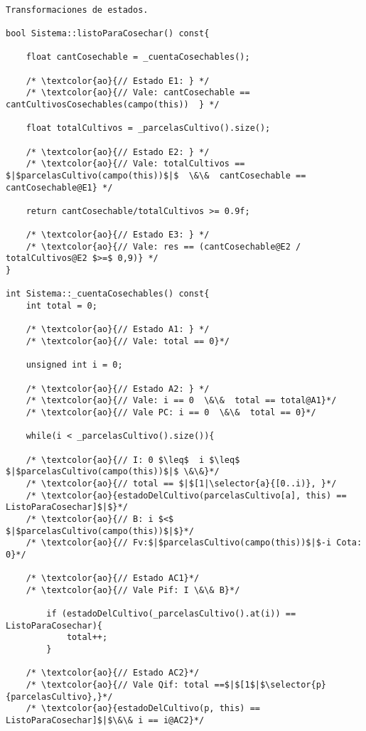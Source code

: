 \begin{lstlisting}

Transformaciones de estados.

bool Sistema::listoParaCosechar() const{
     
    float cantCosechable = _cuentaCosechables();

    /* \textcolor{ao}{// Estado E1: } */
    /* \textcolor{ao}{// Vale: cantCosechable == cantCultivosCosechables(campo(this))  } */

    float totalCultivos = _parcelasCultivo().size();
    
    /* \textcolor{ao}{// Estado E2: } */
    /* \textcolor{ao}{// Vale: totalCultivos == $|$parcelasCultivo(campo(this))$|$  \&\&  cantCosechable == cantCosechable@E1} */
    
    return cantCosechable/totalCultivos >= 0.9f;
    
    /* \textcolor{ao}{// Estado E3: } */
    /* \textcolor{ao}{// Vale: res == (cantCosechable@E2 / totalCultivos@E2 $>=$ 0,9)} */
}

int Sistema::_cuentaCosechables() const{
    int total = 0;
	
    /* \textcolor{ao}{// Estado A1: } */
    /* \textcolor{ao}{// Vale: total == 0}*/
    
    unsigned int i = 0;

    /* \textcolor{ao}{// Estado A2: } */
    /* \textcolor{ao}{// Vale: i == 0  \&\&  total == total@A1}*/
    /* \textcolor{ao}{// Vale PC: i == 0  \&\&  total == 0}*/
    
    while(i < _parcelasCultivo().size()){

    /* \textcolor{ao}{// I: 0 $\leq$  i $\leq$ $|$parcelasCultivo(campo(this))$|$ \&\&}*/
    /* \textcolor{ao}{// total == $|$[1|\selector{a}{[0..i)}, }*/
	/* \textcolor{ao}{estadoDelCultivo(parcelasCultivo[a], this) == ListoParaCosechar]$|$}*/
    /* \textcolor{ao}{// B: i $<$ $|$parcelasCultivo(campo(this))$|$}*/
    /* \textcolor{ao}{// Fv:$|$parcelasCultivo(campo(this))$|$-i Cota: 0}*/    	
    	
    /* \textcolor{ao}{// Estado AC1}*/
    /* \textcolor{ao}{// Vale Pif: I \&\& B}*/
    		
        if (estadoDelCultivo(_parcelasCultivo().at(i)) == ListoParaCosechar){
            total++;
        }

    /* \textcolor{ao}{// Estado AC2}*/
    /* \textcolor{ao}{// Vale Qif: total ==$|$[1$|$\selector{p}{parcelasCultivo},}*/  
    /* \textcolor{ao}{estadoDelCultivo(p, this) == ListoParaCosechar]$|$\&\& i == i@AC2}*/


\end{lstlisting}
